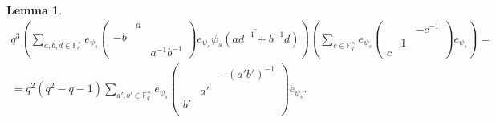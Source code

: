 \documentclass[12pt,reqno]{amsart}
\newtheorem{lem}[thm]{Lemma}
\theoremstyle{definition}
\theoremstyle{remark}
\numberwithin{equation}{section}
\def\IM#1{\textcolor[rgb]{0.00,0.00,0.75}{[I: #1]}}
\begin{document}
\begin{lem}\label{B_6}
    \begin{multline*}
        q^3\left(\sum_{a, b,d \in \mathbb{F}_q^\times}e_{\psi_s} \begin{pmatrix}
            & a &\\
            -b & &\\
            & & a^{-1}b^{-1}
        \end{pmatrix} e_{\psi_s} \overline{\psi_s(ad^{-1}+b^{-1}d)} \right) \left(\sum_{c \in \mathbb{F}_q^\times} e_{\psi_s} \begin{pmatrix}
            & & -c^{-1}\\
            & 1 &\\
            c & &
        \end{pmatrix} e_{\psi_s}\right) =
        \\ = q^2(q^2-q-1)\sum_{a',b'\in\mathbb{F}_q^{\times}}e_{\psi_s} \begin{pmatrix}
            & & -(a'b')^{-1}\\
            & a' & \\
            b' & &\\
        \end{pmatrix} e_{\psi_s}. 
    \end{multline*}
\end{lem}
\end{document}
